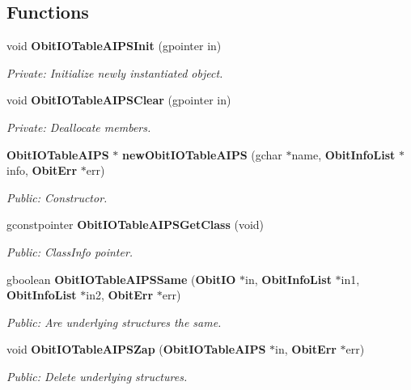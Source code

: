 \subsection*{Functions}
\begin{CompactItemize}
\item 
void {\bf Obit\-IOTable\-AIPSInit} (gpointer in)
\begin{CompactList}\small\item\em Private: Initialize newly instantiated object. \item\end{CompactList}\item 
void {\bf Obit\-IOTable\-AIPSClear} (gpointer in)
\begin{CompactList}\small\item\em Private: Deallocate members. \item\end{CompactList}\item 
{\bf Obit\-IOTable\-AIPS} $\ast$ {\bf new\-Obit\-IOTable\-AIPS} (gchar $\ast$name, {\bf Obit\-Info\-List} $\ast$info, {\bf Obit\-Err} $\ast$err)
\begin{CompactList}\small\item\em Public: Constructor. \item\end{CompactList}\item 
gconstpointer {\bf Obit\-IOTable\-AIPSGet\-Class} (void)
\begin{CompactList}\small\item\em Public: Class\-Info pointer. \item\end{CompactList}\item 
gboolean {\bf Obit\-IOTable\-AIPSSame} ({\bf Obit\-IO} $\ast$in, {\bf Obit\-Info\-List} $\ast$in1, {\bf Obit\-Info\-List} $\ast$in2, {\bf Obit\-Err} $\ast$err)
\begin{CompactList}\small\item\em Public: Are underlying structures the same. \item\end{CompactList}\item 
void {\bf Obit\-IOTable\-AIPSZap} ({\bf Obit\-IOTable\-AIPS} $\ast$in, {\bf Obit\-Err} $\ast$err)
\begin{CompactList}\small\item\em Public: Delete underlying structures. \item\end{CompactList}\item 

\end{CompactItemize}
